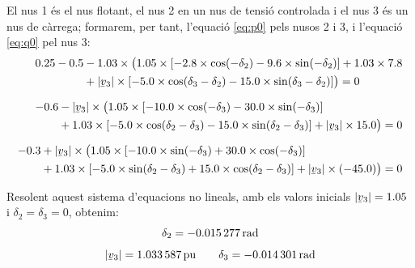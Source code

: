\begin{exemple}
    El nus 1 és el nus flotant, el nus 2 en un nus de tensió controlada
    i el nus 3 és un nus de càrrega; formarem, per tant, l'equació
    \eqref{eq:p0} pels nusos 2 i 3, i l'equació \eqref{eq:q0} pel nus 3:
    \begin{align*}
    \begin{split}
    \num{0,25}-\num{0,5} &- \num{1,03}\times \bigl( \num{1,05}\times [\num{-2,8}
    \times\cos(-\delta_2) - \num{9,6}
    \times\sin( -\delta_2)]  + \num{1,03} \times \num{7,8} \\
    &+ |\cmplx{v}_3|\times [\num{-5,0} \times\cos(\delta_3-\delta_2) -
    \num{15,0}\times \sin(\delta_3-\delta_2)]
     \bigr)  = 0 \end{split} \\[1.5ex]
    \begin{split}
    \num{-0,6} &- |\cmplx{v}_3| \times \bigl( \num{1,05}\times [-\num{10,0}
    \times\cos(-\delta_3)
    - \num{30,0}\times\sin(-\delta_3)]  \\
    &+ \num{1,03}\times [-\num{5,0}\times\cos(\delta_2-\delta_3) -
    \num{15,0}\times\sin(\delta_2-\delta_3)]
     + |\cmplx{v}_3| \times \num{15,0} \bigr)  = 0 \end{split}  \\[1.5ex]
    \begin{split}
    -\num{0,3} &+ |\cmplx{v}_3|\times \bigl( \num{1,05}
    \times[-\num{10,0}\times\sin(-\delta_3) +
    \num{30,0}\times\cos(-\delta_3)]  \\
    &+ \num{1,03} \times[-\num{5,0}\times\sin(\delta_2-\delta_3) +
    \num{15,0}\times\cos(\delta_2-\delta_3)] + |\cmplx{v}_3|\times (\num{-45,0})
    \bigr)  = 0 \end{split}
    \end{align*}

    Resolent aquest sistema d'equacions no lineals, amb els valors
    inicials $|\cmplx{v}_3|=\num{1,05}$ i $\delta_2=\delta_3=0$, obtenim:
    \begin{gather*}
       \delta_2=\qty{-0,015277}{rad} \\[1ex]
       |\cmplx{v}_3|=\qty{1,033587}{pu} \qquad \delta_3=\qty{-0,014301}{rad}
    \end{gather*}


\end{exemple}
